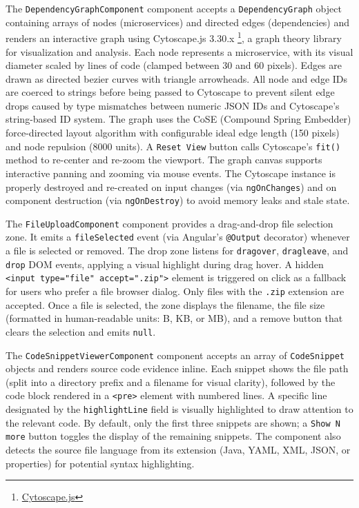 \par The \texttt{DependencyGraphComponent} component accepts a \texttt{DependencyGraph} object containing arrays of nodes (microservices) and directed edges (dependencies) and renders an interactive graph using Cytoscape.js 3.30.x \footnote{\href{https://cytoscape.org/index.html}{Cytoscape.js}}, a graph theory library for visualization and analysis. Each node represents a microservice, with its visual diameter scaled by lines of code (clamped between 30 and 60 pixels). Edges are drawn as directed bezier curves with triangle arrowheads. All node and edge IDs are coerced to strings before being passed to Cytoscape to prevent silent edge drops caused by type mismatches between numeric JSON IDs and Cytoscape's string-based ID system. The graph uses the CoSE (Compound Spring Embedder) force-directed layout algorithm with configurable ideal edge length (150 pixels) and node repulsion (8000 units). A \texttt{Reset View} button calls Cytoscape's \texttt{fit()} method to re-center and re-zoom the viewport. The graph canvas supports interactive panning and zooming via mouse events. The Cytoscape instance is properly destroyed and re-created on input changes (via \texttt{ngOnChanges}) and on component destruction (via \texttt{ngOnDestroy}) to avoid memory leaks and stale state.

\par The \texttt{FileUploadComponent} component provides a drag-and-drop file selection zone. It emits a \texttt{fileSelected} event (via Angular's \texttt{@Output} decorator) whenever a file is selected or removed. The drop zone listens for \texttt{dragover}, \texttt{dragleave}, and \texttt{drop} DOM events, applying a visual highlight during drag hover. A hidden \texttt{<input type="file" accept=".zip">} element is triggered on click as a fallback for users who prefer a file browser dialog. Only files with the \texttt{.zip} extension are accepted. Once a file is selected, the zone displays the filename, the file size (formatted in human-readable units: B, KB, or MB), and a remove button that clears the selection and emits \texttt{null}.

\par The \texttt{CodeSnippetViewerComponent} component accepts an array of \texttt{CodeSnippet} objects and renders source code evidence inline. Each snippet shows the file path (split into a directory prefix and a filename for visual clarity), followed by the code block rendered in a \texttt{<pre>} element with numbered lines. A specific line designated by the \texttt{highlightLine} field is visually highlighted to draw attention to the relevant code. By default, only the first three snippets are shown; a \texttt{Show N more} button toggles the display of the remaining snippets. The component also detects the source file language from its extension (Java, YAML, XML, JSON, or properties) for potential syntax highlighting.

